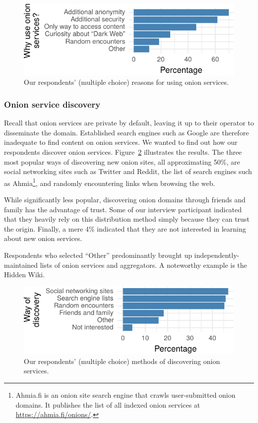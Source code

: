 \begin{figure}[t]
    \centering
    \includegraphics[width=\linewidth]{figures/onion-usage.pdf}
    \caption{Our respondents' (multiple choice) reasons for using onion
    services.}
    \label{fig:onion-usage}
\end{figure}

\subsubsection{Onion service discovery}

Recall that onion services are private by default, leaving it up to their
operator to disseminate the domain.  Established search engines such as Google
are therefore inadequate to find content on onion services.  We wanted to find
out how our respondents discover onion services.
Figure~\ref{fig:onion-discovery} illustrates the results.  The three most
popular ways of discovering new onion sites, all approximating 50\%, are social
networking sites such as Twitter and Reddit, the list of search engines such as
Ahmia\footnote{Ahmia.fi is an onion site search engine that crawls
user-submitted onion domains.  It publishes the list of all indexed onion
services at \url{https://ahmia.fi/onions/}.}, and randomly encountering links
when browsing the web.

While significantly less popular, discovering onion domains through friends and
family has the advantage of trust.  Some of our interview participant indicated
that they heavily rely on this distribution method simply because they can trust
the origin.  Finally, a mere 4\% indicated that they are not interested in
learning about new onion services.

Respondents who selected ``Other'' predominantly brought up
independently-maintained lists of onion services and aggregators.  A noteworthy
example is the Hidden Wiki.

\begin{figure}[t]
    \centering
    \includegraphics[width=\linewidth]{figures/onion-discovery.pdf}
    \caption{Our respondents' (multiple choice) methods of discovering onion
    services.}
    \label{fig:onion-discovery}
\end{figure}

